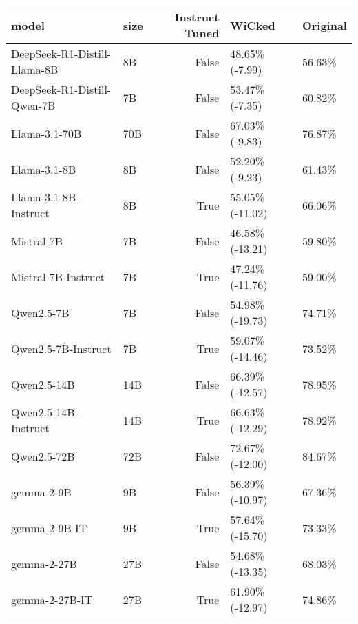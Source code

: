 \begin{tabular}{llrll}
\toprule
model & size & Instruct Tuned & WiCked & Original \\
\midrule
DeepSeek-R1-Distill-Llama-8B & 8B & False & 48.65\% (-7.99) & 56.63\% \\
DeepSeek-R1-Distill-Qwen-7B & 7B & False & 53.47\% (-7.35) & 60.82\% \\
Llama-3.1-70B & 70B & False & 67.03\% (-9.83) & 76.87\% \\
Llama-3.1-8B & 8B & False & 52.20\% (-9.23) & 61.43\% \\
Llama-3.1-8B-Instruct & 8B & True & 55.05\% (-11.02) & 66.06\% \\
Mistral-7B & 7B & False & 46.58\% (-13.21) & 59.80\% \\
Mistral-7B-Instruct & 7B & True & 47.24\% (-11.76) & 59.00\% \\
Qwen2.5-7B & 7B & False & 54.98\% (-19.73) & 74.71\% \\
Qwen2.5-7B-Instruct & 7B & True & 59.07\% (-14.46) & 73.52\% \\
Qwen2.5-14B & 14B & False & 66.39\% (-12.57) & 78.95\% \\
Qwen2.5-14B-Instruct & 14B & True & 66.63\% (-12.29) & 78.92\% \\
Qwen2.5-72B & 72B & False & 72.67\% (-12.00) & 84.67\% \\
gemma-2-9B & 9B & False & 56.39\% (-10.97) & 67.36\% \\
gemma-2-9B-IT & 9B & True & 57.64\% (-15.70) & 73.33\% \\
gemma-2-27B & 27B & False & 54.68\% (-13.35) & 68.03\% \\
gemma-2-27B-IT & 27B & True & 61.90\% (-12.97) & 74.86\% \\
\bottomrule
\end{tabular}
